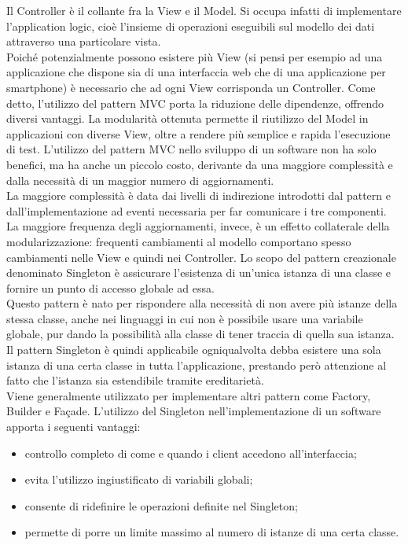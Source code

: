 				Il Controller è il collante fra la View e il Model. Si occupa infatti di implementare l'application logic, cioè l'insieme di operazioni eseguibili sul modello dei dati attraverso una particolare vista.\\
				Poiché potenzialmente possono esistere più View (si pensi per esempio ad una applicazione che dispone sia di una interfaccia web che di una applicazione per smartphone) è necessario che ad ogni View corrisponda un Controller.
			Come detto, l'utilizzo del pattern MVC porta la riduzione delle dipendenze, offrendo diversi vantaggi. La modularità ottenuta permette il riutilizzo del Model in applicazioni con diverse View, oltre a rendere più semplice e rapida l'esecuzione di test. 
			L'utilizzo del pattern MVC nello sviluppo di un software non ha solo benefici, ma ha anche un piccolo costo, derivante da una maggiore complessità e dalla necessità di un maggior numero di aggiornamenti.\\
  			La maggiore complessità è data dai livelli di indirezione introdotti dal pattern e dall'implementazione ad eventi necessaria per far comunicare i tre componenti. La maggiore frequenza degli aggiornamenti, invece, è un effetto collaterale della modularizzazione: frequenti cambiamenti al modello comportano spesso cambiamenti nelle View e quindi nei Controller.
	 \label{app:singleton}
		Lo scopo del pattern creazionale denominato Singleton è 
		assicurare l'esistenza di un'unica istanza di una classe e fornire
		un punto di accesso globale ad essa.\\
		Questo pattern è nato per rispondere alla necessità di non avere più
		istanze della stessa classe, anche nei linguaggi in cui non è possibile 
		usare una variabile globale, pur dando la possibilità alla classe di
		tener traccia di quella sua istanza.\\
		Il pattern Singleton è quindi applicabile ogniqualvolta debba esistere una 
		sola istanza di una certa classe in tutta l'applicazione, prestando però attenzione 
		al fatto che l'istanza sia estendibile tramite ereditarietà.\\
		Viene generalmente utilizzato per implementare altri pattern come Factory, 
		Builder e Façade.
		L'utilizzo del Singleton nell'implementazione di un software apporta i seguenti 
		vantaggi:
		\begin{itemize}
		\item controllo completo di come e quando i client accedono all'interfaccia;
		\item evita l'utilizzo ingiustificato di variabili globali;
		\item consente di ridefinire le operazioni definite nel Singleton;
		\item permette di porre un limite massimo al numero di istanze di una certa classe.
		\end{itemize}
